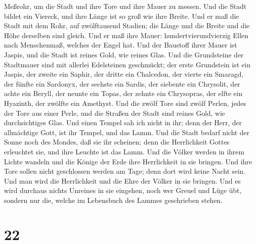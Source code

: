 Meßrohr, um die Stadt und ihre Tore und ihre Mauer zu messen.
 Und die Stadt bildet ein Viereck, und ihre Länge ist so
groß wie ihre Breite. Und er maß die Stadt mit dem Rohr, auf
zwölftausend Stadien; die Länge und die Breite und die Höhe derselben
sind gleich.  Und er maß ihre Mauer:
hundertvierundvierzig Ellen nach Menschenmaß, welches der Engel hat.
 Und der Baustoff ihrer Mauer ist Jaspis, und die Stadt
ist reines Gold, wie reines Glas.  Und die Grundsteine
der Stadtmauer sind mit allerlei Edelsteinen geschmückt; der erste
Grundstein ist ein Jaspis, der zweite ein Saphir, der dritte ein
Chalcedon, der vierte ein Smaragd,  der fünfte ein
Sardonyx, der sechste ein Sardis, der siebente ein Chrysolit, der achte
ein Beryll, der neunte ein Topas, der zehnte ein Chrysopras, der elfte
ein Hyazinth, der zwölfte ein Amethyst.  Und die zwölf
Tore sind zwölf Perlen, jedes der Tore aus einer Perle, und die Straßen
der Stadt sind reines Gold, wie durchsichtiges Glas.  Und
einen Tempel sah ich nicht in ihr; denn der Herr, der allmächtige Gott,
ist ihr Tempel, und das Lamm.  Und die Stadt bedarf nicht
der Sonne noch des Mondes, daß sie ihr scheinen; denn die Herrlichkeit
Gottes erleuchtet sie, und ihre Leuchte ist das Lamm. 
Und die Völker werden in ihrem Lichte wandeln und die Könige der Erde
ihre Herrlichkeit in sie bringen.  Und ihre Tore sollen
nicht geschlossen werden am Tage; denn dort wird keine Nacht sein.
 Und man wird die Herrlichkeit und die Ehre der Völker in
sie bringen.  Und es wird durchaus nichts Unreines in sie
eingehen, noch wer Greuel und Lüge übt, sondern nur die, welche im
Lebensbuch des Lammes geschrieben stehen.

\hypertarget{section-21}{%
\section{22}\label{section-21}}


